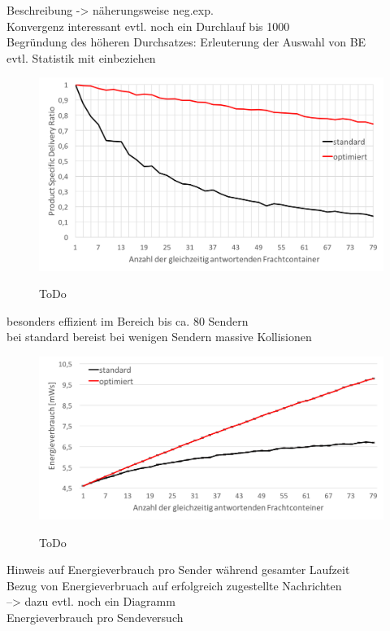 Beschreibung -> näherungsweise neg.exp. \\
Konvergenz interessant evtl. noch ein Durchlauf bis 1000 \\
Begründung des höheren Durchsatzes: Erleuterung der Auswahl von BE \\
evtl. Statistik mit einbeziehen \\

\begin{figure}[bth]
        \myfloatalign
        {\includegraphics[width=1\linewidth]{gfx/Diag_Durchsatz_1_80}} 
        \caption[Durchsatz im Detail]{ToDo}\label{fig:diag_durchsatz_1_80}
\end{figure}

besonders effizient im Bereich bis ca. 80 Sendern \\
bei standard bereist bei wenigen Sendern massive Kollisionen

\begin{figure}[bth]
        \myfloatalign
        {\includegraphics[width=1\linewidth]{gfx/Diag_Energie_1_80}} 
        \caption[Energieverbrauch]{ToDo}\label{fig:diag_Energie_1_80}
\end{figure}

Hinweis auf Energieverbrauch pro Sender während gesamter Laufzeit \\
Bezug von Energieverbruach auf erfolgreich zugestellte Nachrichten\\
--> dazu evtl. noch ein Diagramm \\
Energieverbrauch pro Sendeversuch \\

